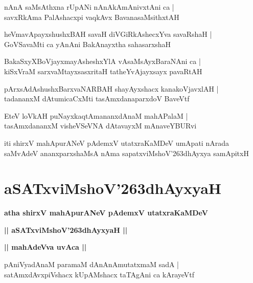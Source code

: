\documentclass[twoside,12pt,openright]{book}
\def\S{\char'263}
\newcounter{shloka}[chapter]
\def\uvaca#1{\centerline{{\large\textbf{#1}}}}
\begin{document}
\begin{shloka}%
nAnA saMsAthxna rUpANi nAnAkAmAnivxtAni ca |\\
savxRkAma PalAshacxpi vaqkAvx BavanasaMsithxtAH
\end{shloka}

\begin{shloka}%
heVmavApayxshushxBAH savaH diVGiRkAshecxYva savaRshaH |\\
GoVSavaMti ca yAnAni BakAnayxtha sahasarxshaH
\end{shloka}

\begin{shloka}%
BakaSxyXBoVjayxmayAsheshxYlA vAsaMsAyxBaraNAni ca |\\
kiSxVraM sarxvaMtayxsasxritaH tatheYvAjayxsayx pavaRtAH
\end{shloka}

\begin{shloka}%
pArxsAdAshushxBarxvaNARBAH shayAyxshacx kanakoVjavxlAH |\\
tadananxM dAtumicaCxMti tasAmxdanaparxdoV BaveVtf
\end{shloka}

\begin{shloka}%
EteV loVkAH puNayxkaqtAmananxdAnaM mahAPalaM |\\
tasAmxdananxM visheVSeVNA dAtavayxM mAnaveYBURvi
\end{shloka}

\begin{center}
iti shirxV mahApurANeV pAdemxV utatxraKaMDeV umApati nArada saMvAdeV  
ananxparxshaMsA nAma sapatxviMshoV\S dhAyxya samApitxH
\end{center}

\chapter{aSATxviMshoV\S dhAyxyaH}

\begin{center}
{\LARGE\bfseries atha shirxV mahApurANeV pAdemxV utatxraKaMDeV}
\end{center}

\begin{center}
{\LARGE\bfseries || aSATxviMshoV\S dhAyxyaH ||}
\end{center}

\uvaca{|| mahAdeVva uvAca ||}

\begin{shloka}%
pAniVyadAnaM paramaM dAnAnAmutatxmaM sadA |\\
satAmxdAvxpiVshacx kUpAMshacx taTAgAni ca kArayeVtf
\end{shloka}
\end{document}
